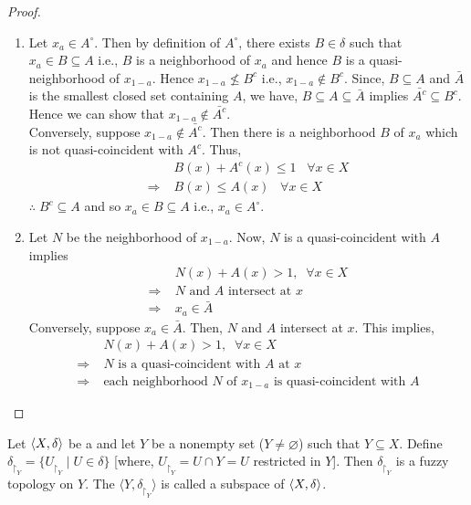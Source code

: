 \documentclass[../main-sheet.tex]{subfiles}
\begin{document}
\begin{proof}\hfill
    \begin{enumerate}
        \item Let \(x_a\in A^\circ\). Then by definition of \(A^\circ\), there exists \(B\in \delta\) such that \(x_a\in B \subseteq A \) i.e., \(B \) is a neighborhood of \(x_a \) and hence \(B \) is a quasi-neighborhood of \(x_{1-a }\). Hence \(x_{1-a }\not\leq B^c\) i.e., \(x_{1-a}\not\in B^c\). Since, \(B\subseteq A \) and \(\bar{A }\) is the smallest closed set containing \(A \), we have, \(B\subseteq A\subseteq \bar{A }\) implies \(\bar{A^c} \subseteq B^c\). Hence we can show that \(x_{1-a}\not\in \bar{A^c}\).\\
        
        Conversely, suppose \(x_{1-a}\not\in \bar{A^c} \). Then there is a neighborhood \(B \) of \(x_a \) which is not quasi-coincident with \(A^c \). Thus, 
        \begin{align*}
            & B(x)+A^c(x) \leq 1\;\;\;\forall x\in X\\
            \Rightarrow\;& B(x)\leq A(x) \;\;\;\forall x\in X
        \end{align*}
        \(\therefore\;B^c\subseteq A \) and so \(x_a \in B \subseteq A \) i.e., \(x_a\in A^\circ\).
        \item Let \(N \) be the neighborhood of \(x_{1-a } \). Now, \(N \) is a quasi-coincident with \(A \) implies
        \begin{align*}
            &N(x)+A(x)>1,\;\;\forall x\in X\\
            \Rightarrow\;&N\text{ and }A \text{ intersect at }x\\
            \Rightarrow\;&x_a\in \bar{A }
        \end{align*}
        Conversely, suppose \(x_a\in \bar{A}\). Then, \(N \) and \(A \) intersect at \(x \). This implies,
        \begin{align*}
            &N(x)+A(x)>1,\;\;\forall x\in X\\
            \Rightarrow\;&N\text{ is a quasi-coincident with }A \text{ at }x\\
            \Rightarrow\;&\text{each neighborhood \(N \) of \(x_{1-a }\) is quasi-coincident with } A
        \end{align*}
    \end{enumerate}
\end{proof}
\begin{defn}[Subspace]
    Let \(\langle X, \delta \rangle\) be a \fts \s and let \(Y \) be a nonempty set (\(Y\neq \varnothing\)) such that \(Y\subseteq X\). Define \(\delta_{\upharpoonright_Y }=\{U_{\upharpoonright_Y}\mid U\in\delta\} \) [where, \(U_{\upharpoonright_Y}=U\cap Y=U \) restricted in \(Y\)]. Then \(\delta_{\upharpoonright_Y }\) is a fuzzy topology on \(Y \). The \fts\s\(\langle Y,\delta_{\upharpoonright_Y }\rangle\) is called a subspace of \(\langle X, \delta \rangle\).
\end{defn}
\end{document}
